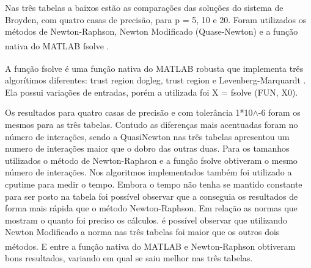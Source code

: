 \documentclass[
	12pt,				%
	oneside,			%
	a4paper,			%
	english,			%
	french,				%
	spanish,			%
	brazil				%
	]{abntex2}
\newcommand{\MATLAB}{MATLAB\textsuperscript{\textregistered}\xspace}
\begin{document}
Nas três tabelas a baixos estão as comparações das soluções do sistema de Broyden, com quatro casas de precisão, para p = 5, 10 e 20. Foram utilizados os métodos de Newton-Raphson, Newton Modificado (Quase-Newton) e a função nativa do \MATLAB fsolve \cite{matworks}.

A função fsolve é uma função nativa do \MATLAB robusta que implementa três algorítimos diferentes: trust region dogleg, trust region e Levenberg-Marquardt \cite{matsumoto}. Ela possui variações de entradas, porém a utilizada foi X = fsolve (FUN, X0).

Os resultados para quatro casas de precisão e com tolerância 1*10$\mathrm{\wedge}$-6 foram os mesmos para as três tabelas. Contudo as  diferenças mais acentuadas foram no número de interações, sendo a QuasiNewton nas três tabelas apresentou um numero de interações maior que o dobro das outras duas.  Para os tamanhos  utilizados o método de Newton-Raphson e a função   fsolve obtiveram o mesmo número de interações. Nos algoritmos implementados também foi utilizado a cputime para medir o tempo. Embora o tempo não tenha se mantido constante para ser posto na tabela foi possível observar que a conseguia os resultados de forma mais rápida que o método Newton-Raphson.  Em relação as normas que mostram o quanto foi preciso os cálculos. é possível observar que utilizando Newton Modificado a norma nas três tabelas foi maior que os outros dois métodos. E entre a função nativa do \MATLAB e Newton-Raphson obtiveram bons resultados, variando em qual se saiu melhor nas três tabelas.
\end{document}
